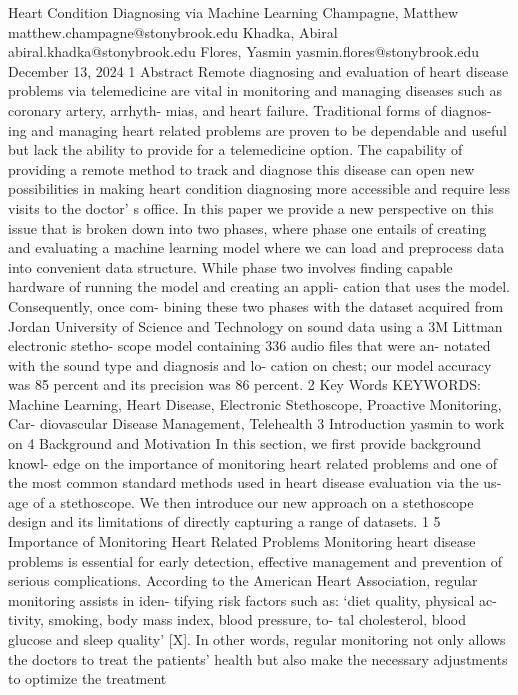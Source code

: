 Heart Condition Diagnosing via Machine Learning
Champagne, Matthew
matthew.champagne@stonybrook.edu
Khadka, Abiral
abiral.khadka@stonybrook.edu
Flores, Yasmin
yasmin.flores@stonybrook.edu
December 13, 2024
1 Abstract
Remote diagnosing and evaluation of heart disease
problems via telemedicine are vital in monitoring and
managing diseases such as coronary artery, arrhyth-
mias, and heart failure. Traditional forms of diagnos-
ing and managing heart related problems are proven
to be dependable and useful but lack the ability to
provide for a telemedicine option. The capability of
providing a remote method to track and diagnose this
disease can open new possibilities in making heart
condition diagnosing more accessible and require less
visits to the doctor’ s office. In this paper we provide
a new perspective on this issue that is broken down
into two phases, where phase one entails of creating
and evaluating a machine learning model where we
can load and preprocess data into convenient data
structure. While phase two involves finding capable
hardware of running the model and creating an appli-
cation that uses the model. Consequently, once com-
bining these two phases with the dataset acquired
from Jordan University of Science and Technology
on sound data using a 3M Littman electronic stetho-
scope model containing 336 audio files that were an-
notated with the sound type and diagnosis and lo-
cation on chest; our model accuracy was 85 percent
and its precision was 86 percent.
2 Key Words
KEYWORDS: Machine Learning, Heart Disease,
Electronic Stethoscope, Proactive Monitoring, Car-
diovascular Disease Management, Telehealth
3 Introduction
yasmin to work on
4 Background and Motivation
In this section, we first provide background knowl-
edge on the importance of monitoring heart related
problems and one of the most common standard
methods used in heart disease evaluation via the us-
age of a stethoscope. We then introduce our new
approach on a stethoscope design and its limitations
of directly capturing a range of datasets.
1
5 Importance of Monitoring
Heart Related Problems
Monitoring heart disease problems is essential for
early detection, effective management and prevention
of serious complications. According to the American
Heart Association, regular monitoring assists in iden-
tifying risk factors such as: ‘diet quality, physical ac-
tivity, smoking, body mass index, blood pressure, to-
tal cholesterol, blood glucose and sleep quality’ [X]. In
other words, regular monitoring not only allows the
doctors to treat the patients’ health but also make
the necessary adjustments to optimize the treatment
